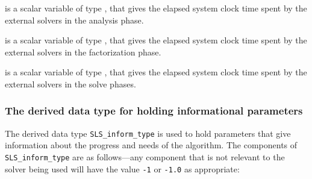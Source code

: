 \documentclass{galahad}
\newcommand{\packagename}{SLS}
\begin{document}
\begin{description}
 is a scalar variable of type \realdp,
that gives the elapsed system clock time spent by the external solvers in the
analysis phase.

 is a scalar variable of type \realdp,
that gives the elapsed system clock time spent by the external solvers in the
factorization phase.

 is a scalar variable of type \realdp,
that gives  the elapsed system clock time spent by the external solvers in the
solve phases.

\end{description}


\subsubsection{The derived data type for holding informational
 parameters}\label{typeinform}
The derived data type
{\tt \packagename\_inform\_type}
is used to hold parameters that give information about the progress and needs
of the algorithm. The components of
{\tt \packagename\_inform\_type}
are as follows---any component that is not relevant to the solver being used
will have the value {\tt -1} or {\tt -1.0} as appropriate:
\end{document}
